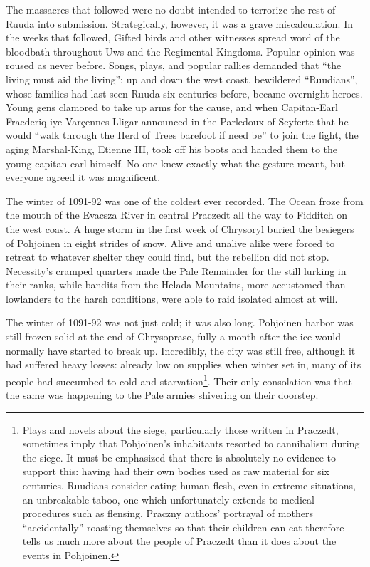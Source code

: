 \documentclass[12pt]{report}
\begin{document}
The massacres that followed were no doubt intended to terrorize the
rest of Ruuda into submission.  Strategically, however, it was a grave
miscalculation.  In the weeks that followed, Gifted birds and other
witnesses spread word of the bloodbath throughout Uws and the
Regimental Kingdoms.  Popular opinion was roused as never before.
Songs, plays, and popular rallies demanded that ``the living must aid
the living''; up and down the west coast, bewildered ``Ruudians'', whose
families had last seen Ruuda six centuries before, became overnight
heroes.  Young gens clamored to take up arms for the cause, and when
Capitan-Earl Fraederiq iye Var\c{c}ennes-Lligar announced in the
Parledoux of Seyferte that he would ``walk through the Herd of Trees
barefoot if need be'' to join the fight, the aging Marshal-King,
Etienne III, took off his boots and handed them to the young
capitan-earl himself.  No one knew exactly what the gesture meant, but
everyone agreed it was magnificent.

The winter of 1091-92 was one of the coldest ever recorded.  The Ocean
froze from the mouth of the Evacsza River in central Praczedt all the
way to Fidditch on the west coast.  A huge storm in the first week of
Chrysoryl buried the besiegers of Pohjoinen in eight strides of snow.
Alive and unalive alike were forced to retreat to whatever shelter
they could find, but the rebellion did not stop.  Necessity's cramped
quarters made the Pale Remainder for the {\aemott} still lurking in
their ranks, while bandits from the Helada Mountains, more accustomed
than lowlanders to the harsh conditions, were able to raid isolated
 almost at will.

The winter of 1091-92 was not just cold; it was also long.  Pohjoinen
harbor was still frozen solid at the end of Chrysoprase, fully a month
after the ice would normally have started to break up.  Incredibly,
the city was still free, although it had suffered heavy losses:
already low on supplies when winter set in, many of its people had
succumbed to cold and starvation\footnote{Plays and novels about the
siege, particularly those written in Praczedt, sometimes imply that
Pohjoinen's inhabitants resorted to cannibalism during the siege.  It
must be emphasized that there is absolutely no evidence to support
this: having had their own bodies used as raw material for six
centuries, Ruudians consider eating human flesh, even in extreme
situations, an unbreakable taboo, one which unfortunately extends to
medical procedures such as flensing.  Praczny authors' portrayal of
mothers ``accidentally'' roasting themselves so that their children can
eat therefore tells us much more about the people of Praczedt than it
does about the events in Pohjoinen.}.  Their only consolation was that
the same was happening to the Pale armies shivering on their doorstep.
\end{document}
